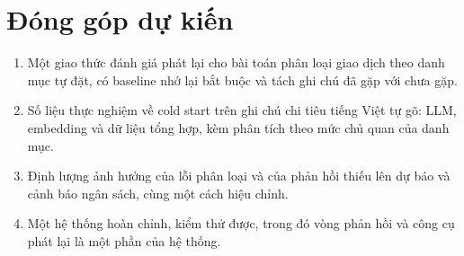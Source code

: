 \documentclass[12pt,a4paper]{article}
\begin{document}
\section{Đóng góp dự kiến}
\begin{enumerate}
  \item Một giao thức đánh giá phát lại cho bài toán phân loại giao dịch theo danh mục tự đặt, có baseline nhớ lại bắt buộc và tách ghi chú đã gặp với chưa gặp.
  \item Số liệu thực nghiệm về cold start trên ghi chú chi tiêu tiếng Việt tự gõ: LLM, embedding và dữ liệu tổng hợp, kèm phân tích theo mức chủ quan của danh mục.
  \item Định lượng ảnh hưởng của lỗi phân loại và của phản hồi thiếu lên dự báo và cảnh báo ngân sách, cùng một cách hiệu chỉnh.
  \item Một hệ thống hoàn chỉnh, kiểm thử được, trong đó vòng phản hồi và công cụ phát lại là một phần của hệ thống.
\end{enumerate}

\end{document}
